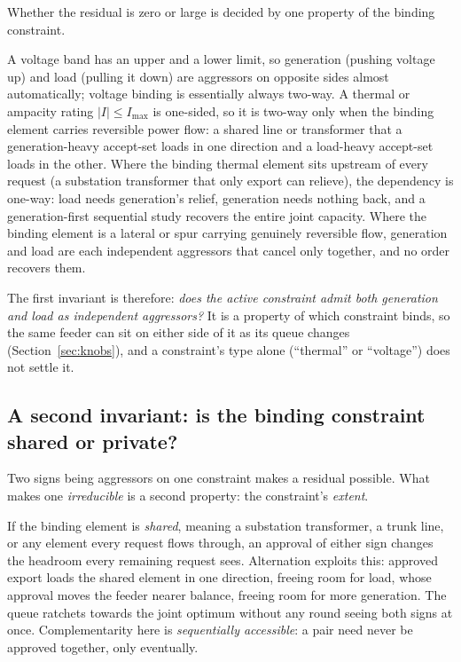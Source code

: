 \documentclass[review,authoryear,12pt]{elsarticle}
\begin{document}
Whether the residual is zero or large is decided by one property of the
binding constraint.

A voltage band has an upper and a lower limit, so generation
(pushing voltage up) and load (pulling it down) are aggressors on opposite
sides almost automatically; voltage binding is essentially always two-way. A
thermal or ampacity rating $|I| \le I_{\max}$ is one-sided, so it is two-way
only when the binding element carries reversible power flow: a shared
line or transformer that a generation-heavy accept-set loads in one
direction and a load-heavy accept-set loads in the other. Where the binding
thermal element sits upstream of every request (a substation transformer
that only export can relieve), the dependency is one-way: load needs
generation's relief, generation needs nothing back, and a generation-first
sequential study recovers the entire joint capacity. Where the binding
element is a lateral or spur carrying genuinely reversible flow, generation
and load are each independent aggressors that cancel only together, and no
order recovers them.

The first invariant is therefore: \emph{does the active constraint admit both
generation and load as independent aggressors?} It is a property of which
constraint binds, so the same feeder can sit on either side of it as its queue
changes (Section~\ref{sec:knobs}), and a constraint's type alone (``thermal''
or ``voltage'') does not settle it.

\subsection{A second invariant: is the binding constraint shared or private?}
\label{sec:invariant-local}

Two signs being aggressors on one constraint makes a residual possible. What
makes one \emph{irreducible} is a second property: the constraint's
\emph{extent}.

If the binding element is \emph{shared}, meaning a substation transformer, a
trunk line, or any element every request flows through, an approval of either
sign changes the headroom every remaining request sees. Alternation exploits
this: approved export loads the shared element in one direction, freeing room
for load, whose approval moves the feeder nearer balance, freeing room for more
generation. The queue ratchets towards the joint optimum without any round
seeing both signs at once. Complementarity here is \emph{sequentially
accessible}: a pair need never be approved together, only eventually.
\end{document}
